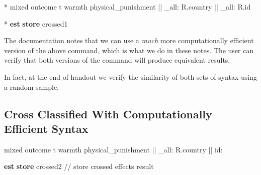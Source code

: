 \documentclass[
  letterpaper,
  DIV=11,
  numbers=noendperiod]{scrreprt}
\newenvironment{Shaded}{\begin{snugshade}}{\end{snugshade}}
\newcommand{\CommentTok}[1]{\textcolor[rgb]{0.37,0.37,0.37}{#1}}
\newcommand{\DataTypeTok}[1]{\textcolor[rgb]{0.68,0.00,0.00}{#1}}
\newcommand{\KeywordTok}[1]{\textcolor[rgb]{0.00,0.23,0.31}{\textbf{#1}}}
\newcommand{\NormalTok}[1]{\textcolor[rgb]{0.00,0.23,0.31}{#1}}
\begin{document}
\begin{Shaded}
\begin{Highlighting}[]
    
\NormalTok{* mixed outcome t warmth physical\_punishment || }\DataTypeTok{\_all}\NormalTok{: R.country || }\DataTypeTok{\_all}\NormalTok{: R.id}
    
\NormalTok{* }\KeywordTok{est} \KeywordTok{store}\NormalTok{ crossed1}
\end{Highlighting}
\end{Shaded}

The documentation notes that we can use a \emph{much} more
computationally efficient version of the above command, which is what we
do in these notes. The user can verify that both versions of the command
will produce equivalent results.

In fact, at the end of handout we verify the similarity of both sets of
syntax using a random sample.

\subsection{Cross Classified With Computationally Efficient
Syntax}\label{cross-classified-with-computationally-efficient-syntax}

\begin{Shaded}
\begin{Highlighting}[]

\NormalTok{mixed outcome t warmth physical\_punishment || }\DataTypeTok{\_all}\NormalTok{: R.country || id:}
    
\KeywordTok{est} \KeywordTok{store}\NormalTok{ crossed2 }\CommentTok{// store crossed effects result}
\end{Highlighting}
\end{Shaded}
\end{document}
